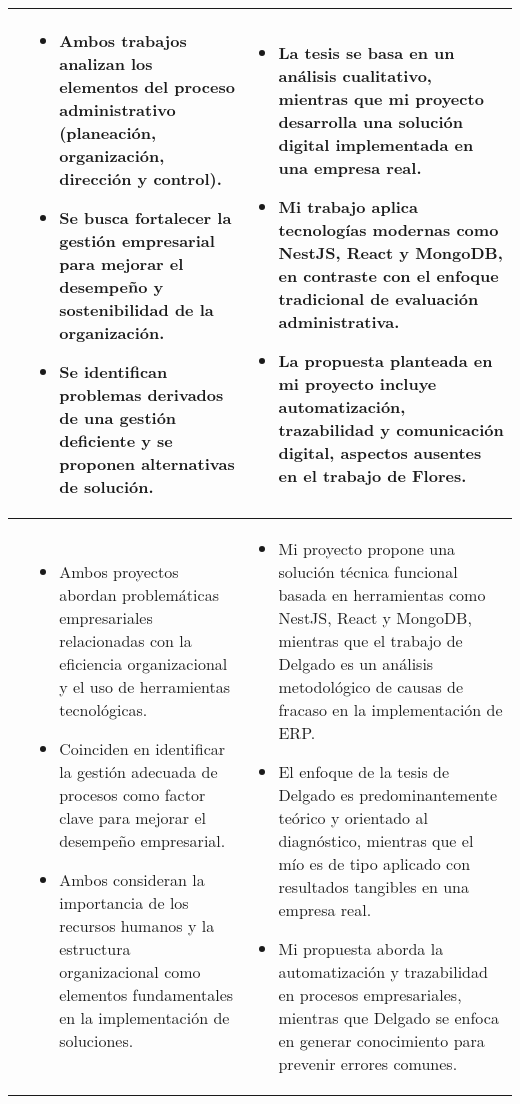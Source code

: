 \begin{longtable}{m{.05\paperwidth} *{2}{m{.33\paperwidth}} @{}}
\cite{Flores15} &
\begin{itemize}[topsep=0pt,itemsep=0pt,parsep=0pt,partopsep=0pt,leftmargin=*]
	\item Ambos trabajos analizan los elementos del proceso administrativo (planeación, organización, dirección y control).
	\item Se busca fortalecer la gestión empresarial para mejorar el desempeño y sostenibilidad de la organización.
	\item Se identifican problemas derivados de una gestión deficiente y se proponen alternativas de solución.
\end{itemize} &
\begin{itemize}[topsep=0pt,itemsep=0pt,parsep=0pt,partopsep=0pt,leftmargin=*]
	\item La tesis se basa en un análisis cualitativo, mientras que mi proyecto desarrolla una solución digital implementada en una empresa real.
	\item Mi trabajo aplica tecnologías modernas como NestJS, React y MongoDB, en contraste con el enfoque tradicional de evaluación administrativa.
	\item La propuesta planteada en mi proyecto incluye automatización, trazabilidad y comunicación digital, aspectos ausentes en el trabajo de Flores.
\end{itemize} \\
\midrule

\cite{Delgado2015} &
\begin{itemize}[topsep=0pt,itemsep=0pt,parsep=0pt,partopsep=0pt,leftmargin=*]
	\item Ambos proyectos abordan problemáticas empresariales relacionadas con la eficiencia organizacional y el uso de herramientas tecnológicas.
	\item Coinciden en identificar la gestión adecuada de procesos como factor clave para mejorar el desempeño empresarial.
	\item Ambos consideran la importancia de los recursos humanos y la estructura organizacional como elementos fundamentales en la implementación de soluciones.
\end{itemize} &
\begin{itemize}[topsep=0pt,itemsep=0pt,parsep=0pt,partopsep=0pt,leftmargin=*]
	\item Mi proyecto propone una solución técnica funcional basada en herramientas como NestJS, React y MongoDB, mientras que el trabajo de Delgado es un análisis metodológico de causas de fracaso en la implementación de ERP.
	\item El enfoque de la tesis de Delgado es predominantemente teórico y orientado al diagnóstico, mientras que el mío es de tipo aplicado con resultados tangibles en una empresa real.
	\item Mi propuesta aborda la automatización y trazabilidad en procesos empresariales, mientras que Delgado se enfoca en generar conocimiento para prevenir errores comunes.
\end{itemize} \\
\midrule


\end{longtable}
